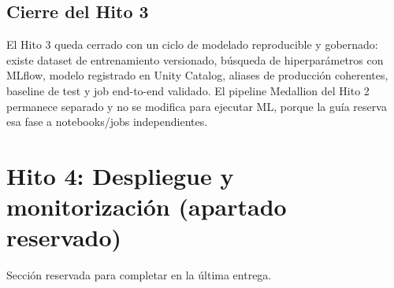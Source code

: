 \documentclass[12pt,a4paper]{article}
\begin{document}
\subsection{Cierre del Hito 3}

El Hito 3 queda cerrado con un ciclo de modelado reproducible y gobernado: existe dataset de entrenamiento versionado, búsqueda de hiperparámetros con MLflow, modelo registrado en Unity Catalog, aliases de producción coherentes, baseline de test y job end-to-end validado. El pipeline Medallion del Hito 2 permanece separado y no se modifica para ejecutar ML, porque la guía reserva esa fase a notebooks/jobs independientes.

\section{Hito 4: Despliegue y monitorización (apartado reservado)}

Sección reservada para completar en la última entrega.
\end{document}
